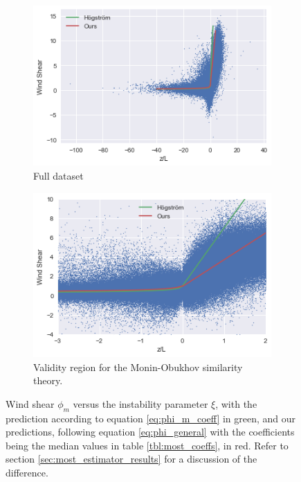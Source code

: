 \documentclass[a4paper]{book}
\begin{document}
\begin{figure}
    \centering
    \begin{subfigure}[t]{0.48\textwidth}
        \centering
        \includegraphics[width=\textwidth]{images/most_full}
        \caption{Full dataset}
        \label{fig:most_full}
    \end{subfigure}
    \hfill
    \begin{subfigure}[t]{0.48\textwidth}
        \centering
        \includegraphics[width=\textwidth]{images/most_zoom}
        \caption{Validity region for the Monin-Obukhov similarity theory.}
        \label{fig:most_zoom}
    \end{subfigure}
    \caption{Wind shear $\phi_m$ versus the instability parameter $\xi$, with the prediction according to equation \ref{eq:phi_m_coeff} in green, and our predictions, following equation \ref{eq:phi_general} with the coefficients being the median values in table \ref{tbl:most_coeffs}, in red. Refer to section \ref{sec:most_estimator_results} for a discussion of the difference.}
	\label{fig:most_scatter}
\end{figure}
\end{document}

